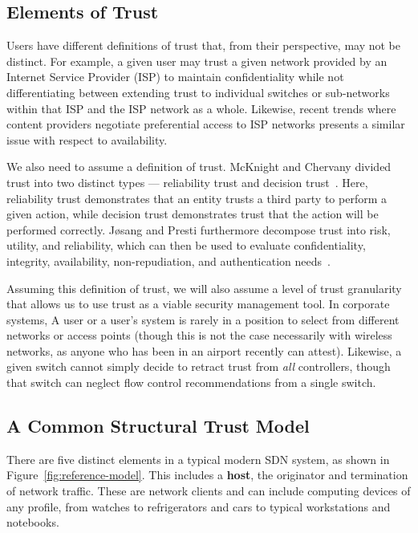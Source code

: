 \documentclass[10pt,conference]{IEEEtran}
\begin{document}
\subsection{Elements of Trust}
\label{sec:elements}
Users have different definitions of trust that, from their perspective, may not be distinct.  For example, a given user may trust a given network provided by an Internet Service Provider (ISP) to maintain confidentiality while not differentiating between extending trust to individual switches or sub-networks within that ISP and the ISP network as a whole.  Likewise, recent trends where content providers negotiate preferential access to ISP networks presents a similar issue with respect to availability.

We also need to assume a definition of trust.  McKnight and Chervany divided trust into two distinct types --- reliability trust and decision trust~\cite{McCh:96}.  Here, reliability trust demonstrates that an entity trusts a third party to perform a given action, while decision trust demonstrates trust that the action will be performed correctly.  J{\o}sang and Presti furthermore decompose trust into risk, utility, and reliability, which can then be used to evaluate confidentiality, integrity, availability, non-repudiation, and authentication needs~\cite{JoPr:04,Wi:93}.

Assuming this definition of trust, we will also assume a level of trust granularity that allows us to use trust as a viable security management tool.  In corporate systems, A user or a user's system is rarely in a position to select from different networks or access points (though this is not the case necessarily with wireless networks, as anyone who has been in an airport recently can attest).  Likewise, a given switch cannot simply decide to retract trust from {\sl all} controllers, though that switch can neglect flow control recommendations from a single switch.

\subsection{A Common Structural Trust Model}
There are five distinct elements in a typical modern SDN system, as shown in Figure~\ref{fig:reference-model}.  This includes a {\bf host}, the originator and termination of network traffic.  These are network clients and can include computing devices of any profile, from watches to refrigerators and cars to typical workstations and notebooks.
\end{document}
